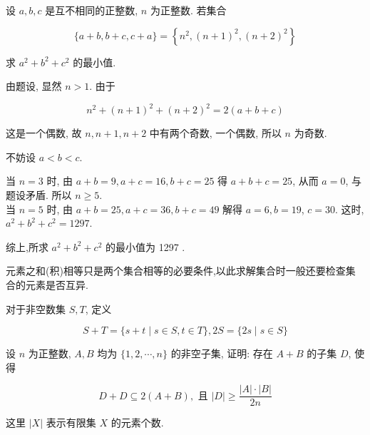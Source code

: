 \begin{example}
设 $a ,  b ,  c$ 是互不相同的正整数, $n$ 为正整数. 若集合

$$
\{a+b, b+c, c+a\}=\left\{n^{2},(n+1)^{2},(n+2)^{2}\right\}
$$

求 $a^{2}+b^{2}+c^{2}$ 的最小值.
\end{example}

\begin{solution}
由题设, 显然 $n>1$. 由于

$$
n^{2}+(n+1)^{2}+(n+2)^{2}=2(a+b+c)
$$

这是一个偶数, 故 $n ,  n+1 ,  n+2$ 中有两个奇数, 一个偶数, 所以 $n$ 为奇数.

不妨设 $a<b<c$.

当 $n=3$ 时, 由 $a+b=9, a+c=16, b+c=25$ 得 $a+b+c=25$, 从而 $a=0$, 与题设矛盾. 所以 $n \geqslant 5$.\\
当 $n=5$ 时, 由 $a+b=25, a+c=36, b+c=49$ 解得 $a=6, b=19$, $c=30$. 这时, $a^{2}+b^{2}+c^{2}=1297$.

综上,所求 $a^{2}+b^{2}+c^{2}$ 的最小值为 1297 .
\end{solution}

\begin{note}
	元素之和(积)相等只是两个集合相等的必要条件,以此求解集合时一般还要检查集合的元素是否互异.
\end{note}

\begin{example}\label{ex:6}
对于非空数集 $S ,  T$, 定义

$$
S+T=\{s+t \mid s \in S, t \in T\}, 2 S=\{2 s \mid s \in S\}
$$

设 $n$ 为正整数, $A ,  B$ 均为 $\{1,2, \cdots, n\}$ 的非空子集, 证明: 存在 $A+B$ 的子集 $D$, 使得

$$
D+D \subseteq 2(A+B), \text { 且 }|D| \geqslant \frac{|A| \cdot|B|}{2 n}
$$

这里 $|X|$ 表示有限集 $X$ 的元素个数.
\end{example}

